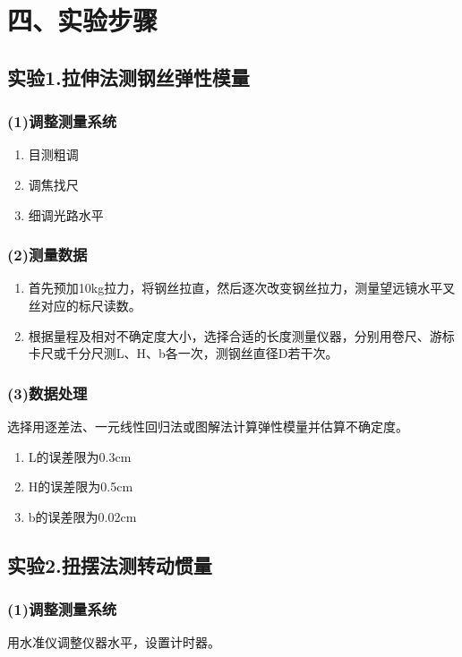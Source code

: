 \documentclass[11pt,a4paper,oneside]{article}
\begin{document}
\section*{四、实验步骤}
\subsection*{实验1.拉伸法测钢丝弹性模量}
\subsubsection*{(1)调整测量系统}
\begin{enumerate}
\item 目测粗调
\item 调焦找尺
\item 细调光路水平
\end{enumerate}
\subsubsection*{(2)测量数据}
\begin{enumerate}
\item 首先预加10kg拉力，将钢丝拉直，然后逐次改变钢丝拉力，测量望远镜水平叉丝对应的标尺读数。
\item 根据量程及相对不确定度大小，选择合适的长度测量仪器，分别用卷尺、游标卡尺或千分尺测L、H、b各一次，测钢丝直径D若干次。
\end{enumerate}
\subsubsection*{(3)数据处理}
选择用逐差法、一元线性回归法或图解法计算弹性模量并估算不确定度。
\begin{enumerate}
\item L的误差限为0.3cm
\item H的误差限为0.5cm
\item b的误差限为0.02cm
\end{enumerate}

\subsection*{实验2.扭摆法测转动惯量}
\subsubsection*{(1)调整测量系统}
用水准仪调整仪器水平，设置计时器。
\end{document}
